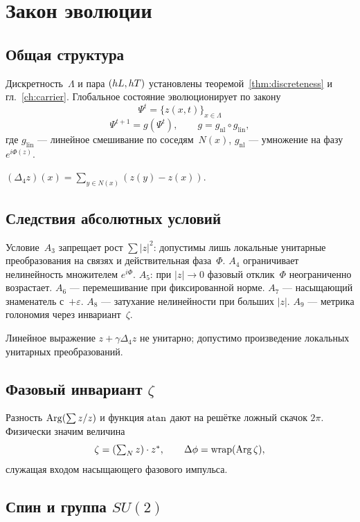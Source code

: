 \chapter{Закон эволюции}
\label{ch:evolution}

\section{Общая структура}

Дискретность~$\Lambda$ и пара $(hL,hT)$ установлены теоремой~\ref{thm:discreteness}
и гл.~\ref{ch:carrier}.
Глобальное состояние эволюционирует по закону
\[
\Psi^t=\{z(x,t)\}_{x\in\Lambda}
\]
\[
  \Psi^{t+1}=g(\Psi^t),\qquad g=g_{\mathrm{nl}}\circ g_{\mathrm{lin}},
\]
где $g_{\mathrm{lin}}$ --- линейное смешивание по соседям~$N(x)$,
$g_{\mathrm{nl}}$ --- умножение на фазу $e^{i\Phi(z)}$.

\begin{definition}
$(\Delta_4 z)(x)=\sum_{y\in N(x)}(z(y)-z(x))$.
\end{definition}

\section{Следствия абсолютных условий}

Условие~$A_3$ запрещает рост $\sum|z|^2$: допустимы лишь локальные унитарные преобразования
на связях и действительная фаза~$\Phi$.
$A_4$ ограничивает нелинейность множителем $e^{i\Phi}$.
$A_5$: при $|z|\to 0$ фазовый отклик~$\Phi$ неограниченно возрастает.
$A_6$ --- перемешивание при фиксированной норме.
$A_7$ --- насыщающий знаменатель с~$+\varepsilon$.
$A_8$ --- затухание нелинейности при больших $|z|$.
$A_9$ --- метрика голономия через инвариант~$\zeta$.

Линейное выражение $z+\gamma\Delta_4 z$ не унитарно;
допустимо произведение локальных унитарных преобразований.

\section{Фазовый инвариант \texorpdfstring{$\zeta$}{zeta}}

Разность $\operatorname{Arg}(\sum z/z)$ и функция $\operatorname{atan}$ дают на решётке ложный скачок $2\pi$.
Физически значим величина
\[
  \zeta=(\textstyle\sum_N z)\cdot z^*,\qquad \Delta\phi=\operatorname{wrap}(\operatorname{Arg}\zeta),
\]
служащая входом насыщающего фазового импульса.

\section{Спин и группа \texorpdfstring{$SU(2)$}{SU(2)}}

